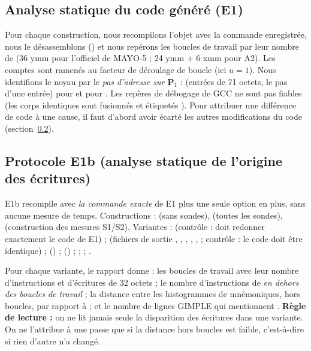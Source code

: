 \subsection{Analyse statique du code généré (E1)}
Pour chaque construction, nous recompilons l'objet avec la commande enregistrée, nous le désassemblons () et nous repérons les boucles de travail par leur nombre de  (36 ymm pour l'officiel de MAYO-5 ; 24 ymm + 6 xmm pour A2). Les comptes sont ramenés au facteur de déroulage de boucle (ici $u=1$). Nous identifions le noyau par le \emph{pas d'adresse sur $\mathbf{P}_1$} :  (entrées de 71 octets, le pas d'une entrée) pour  et  pour . Les repères de débogage de GCC ne sont pas fiables (les corps identiques sont fusionnés et étiquetés ). Pour attribuer une différence de code à une cause, il faut d'abord avoir écarté les autres modifications du code (section~\ref{sec:e1b}).

\subsection{Protocole E1b (analyse statique de l'origine des écritures)}\label{sec:e1b}
E1b recompile  avec \emph{la commande exacte} de E1 plus une seule option en plus, sans aucune mesure de temps. Constructions :  (sans sondes),  (toutes les sondes),  (construction des mesures S1/S2). Variantes :  (contrôle : doit redonner exactement le code de E1) ;  (fichiers de sortie , , , , ,  ; contrôle : le code doit être identique) ;  () ;  () ;  ;  ; .

Pour chaque variante, le rapport donne : les boucles de travail avec leur nombre d'instructions et d'écritures de 32 octets ; le nombre d'instructions de  \emph{en dehors des boucles de travail} ; la distance entre les histogrammes de mnémoniques, hors boucles, par rapport à  ; et le nombre de lignes GIMPLE qui mentionnent . \textbf{Règle de lecture :} on ne lit jamais seule la disparition des écritures dans une variante. On ne l'attribue à une passe que si la distance hors boucles est faible, c'est-à-dire si rien d'autre n'a changé.


